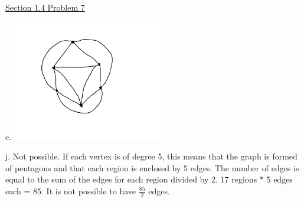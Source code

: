 \documentclass{article}
\begin{document}
\underline{Section 1.4 Problem 7}\newline{}

e. \includegraphics[height=200px]{hw2q7e.png}\newline{}

j. Not possible. If each vertex is of degree 5, this means that the graph is formed of pentagons and that each region is enclosed by 5 edges. The number of edges is equal to the sum of the edges for each region divided by 2. 17 regions * 5 edges each = 85. It is not possible to have $\frac{85}{2}$ edges.
\end{document}
